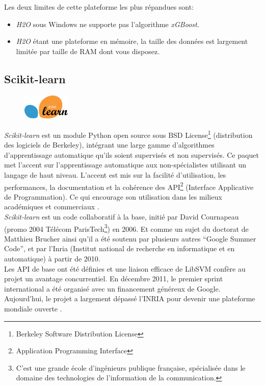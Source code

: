 Les deux limites de cette plateforme les plus répandues sont:   
\begin{itemize}
\item[\textbullet] \textit{H2O} sous Windows ne supporte pas l'algorithme \textit{xGBoost}.
\item[\textbullet] \textit{H2O} étant une plateforme en mémoire, la taille des données est largement limitée par taille de RAM dont vous disposez. 
\end{itemize}


\subsection{Scikit-learn}\label{defscikit}
\begin{figure}
    \includegraphics[width=0.2\textwidth]{img/scikitlogo.png}
\end{figure}
\textit{Scikit-learn} est un module Python open source sous BSD License\footnote{Berkeley Software Distribution License} (distribution des logiciels de Berkeley), intégrant une large gamme d’algorithmes d’apprentissage automatique qu'ils soient supervisés et non supervisés. Ce paquet met l'accent sur l'apprentissage automatique aux non-spécialistes utilisant un langage de haut niveau. L'accent est mis sur la facilité d'utilisation, les performances, la documentation et la cohérence des API\footnote{Application Programming Interface} (Interface Applicative de Programmation). Ce qui encourage son utilisation dans les milieux académiques et commerciaux \citep{pedregosa2011scikit}. \\


\textit{Scikit-learn} est un code collaboratif à la base, initié par David Cournapeau (promo 2004 Télécom ParisTech\footnote{C'est une grande école d’ingénieurs publique française, spécialisée dans le domaine des technologies de l'information de la communication.}) en 2006. Et comme un sujet du doctorat de Matthieu Brucher ainsi qu'il a été soutenu par plusieurs autres “Google Summer Code”, et par l'Inria (Institut national de recherche en informatique et en automatique) à partir de 2010.\\

Les API de base ont été définies et une liaison efficace de LibSVM \citep{chang2011libsvm} confère au projet un avantage concurrentiel. En décembre 2011, le premier sprint international a été organisé avec un financement généreux de Google. Aujourd'hui, le projet a largement dépassé l'INRIA pour devenir une plateforme mondiale ouverte \citep{article}.\\

